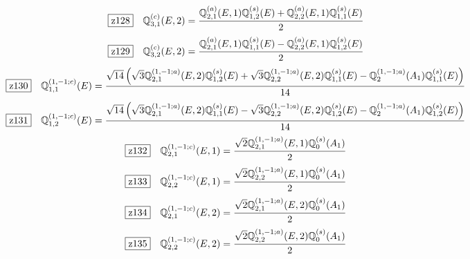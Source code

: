 \documentclass[fleqn,10pt,landscape]{jsarticle}
\begin{document}
\begin{dmath*}
\hspace*{3mm}\fbox{z128}\quad \mathbb{Q}_{3,1}^{(c)}(E,2)=\frac{\mathbb{Q}_{2,1}^{(a)}(E,1) \mathbb{Q}_{1,2}^{(s)}(E) + \mathbb{Q}_{2,2}^{(a)}(E,1) \mathbb{Q}_{1,1}^{(s)}(E)}{2}
\end{dmath*}
\begin{dmath*}
\hspace*{3mm}\fbox{z129}\quad \mathbb{Q}_{3,2}^{(c)}(E,2)=\frac{\mathbb{Q}_{2,1}^{(a)}(E,1) \mathbb{Q}_{1,1}^{(s)}(E) - \mathbb{Q}_{2,2}^{(a)}(E,1) \mathbb{Q}_{1,2}^{(s)}(E)}{2}
\end{dmath*}
\begin{dmath*}
\hspace*{3mm}\fbox{z130}\quad \mathbb{Q}_{1,1}^{(1,-1;c)}(E)=\frac{\sqrt{14} \left(\sqrt{3} \mathbb{Q}_{2,1}^{(1,-1;a)}(E,2) \mathbb{Q}_{1,2}^{(s)}(E) + \sqrt{3} \mathbb{Q}_{2,2}^{(1,-1;a)}(E,2) \mathbb{Q}_{1,1}^{(s)}(E) - \mathbb{Q}_{2}^{(1,-1;a)}(A_{1}) \mathbb{Q}_{1,1}^{(s)}(E)\right)}{14}
\end{dmath*}
\begin{dmath*}
\hspace*{3mm}\fbox{z131}\quad \mathbb{Q}_{1,2}^{(1,-1;c)}(E)=\frac{\sqrt{14} \left(\sqrt{3} \mathbb{Q}_{2,1}^{(1,-1;a)}(E,2) \mathbb{Q}_{1,1}^{(s)}(E) - \sqrt{3} \mathbb{Q}_{2,2}^{(1,-1;a)}(E,2) \mathbb{Q}_{1,2}^{(s)}(E) - \mathbb{Q}_{2}^{(1,-1;a)}(A_{1}) \mathbb{Q}_{1,2}^{(s)}(E)\right)}{14}
\end{dmath*}
\begin{dmath*}
\hspace*{3mm}\fbox{z132}\quad \mathbb{Q}_{2,1}^{(1,-1;c)}(E,1)=\frac{\sqrt{2} \mathbb{Q}_{2,1}^{(1,-1;a)}(E,1) \mathbb{Q}_{0}^{(s)}(A_{1})}{2}
\end{dmath*}
\begin{dmath*}
\hspace*{3mm}\fbox{z133}\quad \mathbb{Q}_{2,2}^{(1,-1;c)}(E,1)=\frac{\sqrt{2} \mathbb{Q}_{2,2}^{(1,-1;a)}(E,1) \mathbb{Q}_{0}^{(s)}(A_{1})}{2}
\end{dmath*}
\begin{dmath*}
\hspace*{3mm}\fbox{z134}\quad \mathbb{Q}_{2,1}^{(1,-1;c)}(E,2)=\frac{\sqrt{2} \mathbb{Q}_{2,1}^{(1,-1;a)}(E,2) \mathbb{Q}_{0}^{(s)}(A_{1})}{2}
\end{dmath*}
\begin{dmath*}
\hspace*{3mm}\fbox{z135}\quad \mathbb{Q}_{2,2}^{(1,-1;c)}(E,2)=\frac{\sqrt{2} \mathbb{Q}_{2,2}^{(1,-1;a)}(E,2) \mathbb{Q}_{0}^{(s)}(A_{1})}{2}
\end{dmath*}
\end{document}
